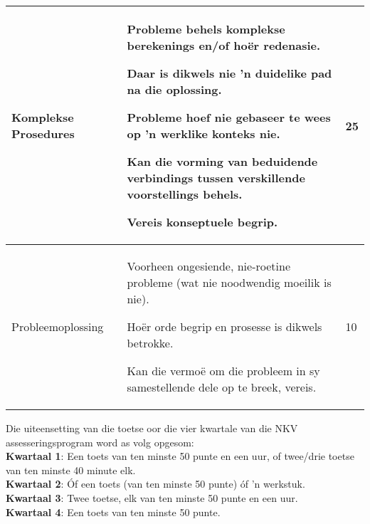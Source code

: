 \begin{table}[H]
\begin{center}
\begin{tabular} {|p{3cm}|p{6cm}|p{2.5cm}|}
Komplekse Prosedures &
Probleme behels komplekse berekenings en/of ho\"{e}r redenasie. \par 
Daar is dikwels nie 'n duidelike pad na die oplossing. \par 
Probleme hoef nie gebaseer te wees op 'n werklike konteks nie. \par 
Kan die vorming van beduidende verbindings tussen verskillende
voorstellings behels.\par
Vereis konseptuele begrip.
&
25 \\ \hline
Probleemoplossing & 
Voorheen ongesiende, nie-roetine probleme (wat nie noodwendig moeilik
is nie). \par 
Ho\"{e}r orde begrip en prosesse is dikwels betrokke. \par 
Kan die vermo\"{e} om die probleem in sy samestellende dele op te
breek, vereis.
&
10 \\ \hline

\end{tabular}
 \end{center}
\end{table}

Die uiteensetting van die toetse oor die vier kwartale van die NKV
assesseringsprogram word as volg opgesom:\\
\textbf{Kwartaal 1}: Een toets van ten minste 50 punte en een uur, of twee/drie toetse van ten minste 40 minute elk.\\
\textbf{Kwartaal 2}: \'{O}f een toets (van ten minste 50 punte) \'{o}f 'n werkstuk.\\
\textbf{Kwartaal 3}: Twee toetse, elk van ten minste 50 punte en een uur.\\
\textbf{Kwartaal 4}: Een toets van ten minste 50 punte.\\

